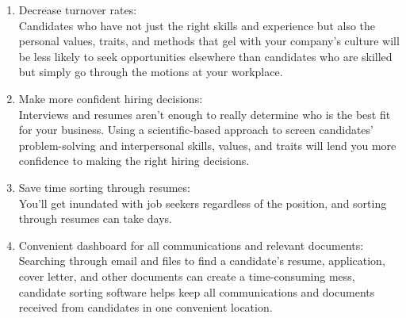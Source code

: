 \documentclass[12 pt, oneside]{book}
\begin{document}
\begin{enumerate}
\item Decrease turnover rates:\\
Candidates who have not just the right skills and experience but also the personal values, traits, and methods that gel with your company’s culture will be less likely to seek opportunities elsewhere than candidates who are skilled but simply go through the motions at your workplace.

\item Make more confident hiring decisions:\\
Interviews and resumes aren’t enough to really determine who is the best fit for your business. Using a scientific-based approach to screen candidates’ problem-solving and interpersonal skills, values, and traits will lend you more confidence to making the right hiring decisions.

\item Save time sorting through resumes:\\
You’ll get inundated with job seekers regardless of the position, and sorting through resumes can take days.

\item Convenient dashboard for all communications and relevant documents:\\
Searching through email and files to find a candidate’s resume, application, cover letter, and other documents can create a time-consuming mess, candidate sorting software helps keep all communications and documents received from candidates in one convenient location.
\end{enumerate}
\end{document}
